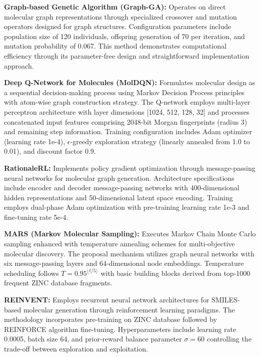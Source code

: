 \documentclass[lettersize,journal]{IEEEtran}
\begin{document}
\noindent \textbf{Graph-based Genetic Algorithm (Graph-GA):} Operates on direct molecular graph representations through specialized crossover and mutation operators designed for graph structures. Configuration parameters include population size of 120 individuals, offspring generation of 70 per iteration, and mutation probability of 0.067. This method demonstrates computational efficiency through its parameter-free design and straightforward implementation approach.

\noindent \textbf{Deep Q-Network for Molecules (MolDQN):} Formulates molecular design as a sequential decision-making process using Markov Decision Process principles with atom-wise graph construction strategy. The Q-network employs multi-layer perceptron architecture with layer dimensions [1024, 512, 128, 32] and processes concatenated input features comprising 2048-bit Morgan fingerprints (radius 3) and remaining step information. Training configuration includes Adam optimizer (learning rate 1e-4), $\epsilon$-greedy exploration strategy (linearly annealed from 1.0 to 0.01), and discount factor 0.9.

\noindent \textbf{RationaleRL:} Implements policy gradient optimization through message-passing neural networks for molecular graph generation. Architecture specifications include encoder and decoder message-passing networks with 400-dimensional hidden representations and 50-dimensional latent space encoding. Training employs dual-phase Adam optimization with pre-training learning rate 1e-3 and fine-tuning rate 5e-4.

\noindent \textbf{MARS (Markov Molecular Sampling):} Executes Markov Chain Monte Carlo sampling enhanced with temperature annealing schemes for multi-objective molecular discovery. The proposal mechanism utilizes graph neural networks with six message-passing layers and 64-dimensional node embeddings. Temperature scheduling follows $T = 0.95^{\lfloor t/5 \rfloor}$ with basic building blocks derived from top-1000 frequent ZINC database fragments.

\noindent \textbf{REINVENT:} Employs recurrent neural network architectures for SMILES-based molecular generation through reinforcement learning paradigms. The methodology incorporates pre-training on ZINC database followed by REINFORCE algorithm fine-tuning. Hyperparameters include learning rate 0.0005, batch size 64, and prior-reward balance parameter $\sigma = 60$ controlling the trade-off between exploration and exploitation.
\end{document}
